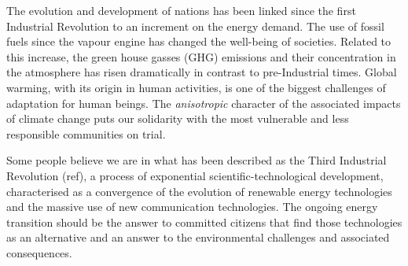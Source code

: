 
The evolution and development of nations has been linked since the first Industrial Revolution to an increment on the energy demand. The use of fossil fuels since the vapour engine has changed the well-being of societies. Related to this increase, the green house gasses (GHG) emissions and their concentration in the atmosphere has risen dramatically in contrast to pre-Industrial times. Global warming, with its origin in human activities, is one of the biggest challenges of adaptation for human beings. The \textit{anisotropic} character of the associated impacts of climate change puts our solidarity with the most vulnerable and less responsible communities on trial.


Some people believe we are in what has been described as the Third Industrial Revolution (ref), a process of exponential scientific-technological development, characterised as a convergence of the evolution of renewable energy technologies and the massive use of new communication technologies. The ongoing energy transition should be the answer to committed citizens that find those technologies as an alternative and an answer to the environmental challenges and associated consequences.     

